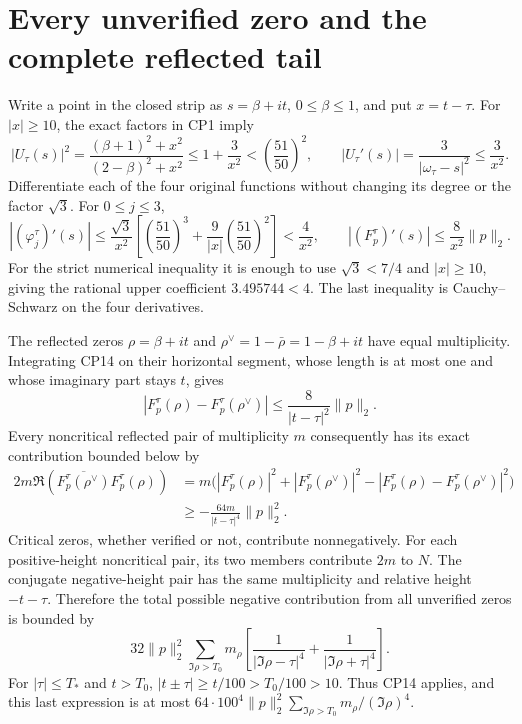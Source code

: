 \documentclass[11pt]{article}
\begin{document}
\section{Every unverified zero and the complete reflected tail}
Write a point in the closed strip as $s=\beta+it$,
$0\le\beta\le1$, and put $x=t-\tau$. For $|x|\ge10$,
the exact factors in CP1 imply
\[
|U_\tau(s)|^2
=\frac{(\beta+1)^2+x^2}{(2-\beta)^2+x^2}
\le1+\frac3{x^2}<\left(\frac{51}{50}\right)^2,\qquad
|U_\tau'(s)|=\frac3{|\omega_\tau-s|^2}\le\frac3{x^2}.
\]
Differentiate each of the four original functions without
changing its degree or the factor $\sqrt3$. For $0\le j\le3$,
\begin{equation}
|(\varphi_j^\tau)'(s)|
\le\frac{\sqrt3}{x^2}
\left[\left(\frac{51}{50}\right)^3+
 \frac9{|x|}\left(\frac{51}{50}\right)^2\right]
<\frac4{x^2},\qquad
|(F_p^\tau)'(s)|\le\frac8{x^2}\|p\|_2 .
\tag{CP14}
\end{equation}
For the strict numerical inequality it is enough to use
$\sqrt3<7/4$ and $|x|\ge10$, giving the rational upper
coefficient $3.495744<4$.
The last inequality is Cauchy--Schwarz on the four derivatives.

The reflected zeros $\rho=\beta+it$ and
$\rho^\vee=1-\bar\rho=1-\beta+it$ have equal multiplicity.
Integrating CP14 on their horizontal segment, whose length
is at most one and whose imaginary part stays $t$, gives
\[
|F_p^\tau(\rho)-F_p^\tau(\rho^\vee)|
\le\frac8{|t-\tau|^2}\|p\|_2.
\]
Every noncritical reflected pair of multiplicity $m$ consequently
has its exact contribution bounded below by
\begin{align}
2m\Re(\overline{F_p^\tau(\rho^\vee)}F_p^\tau(\rho))
&=m\bigl(|F_p^\tau(\rho)|^2+|F_p^\tau(\rho^\vee)|^2
 -|F_p^\tau(\rho)-F_p^\tau(\rho^\vee)|^2\bigr)\nonumber\\
&\ge-\frac{64m}{|t-\tau|^4}\|p\|_2^2.
\tag{CP15}
\end{align}
Critical zeros, whether verified or not, contribute nonnegatively.
For each positive-height noncritical pair, its two members
contribute $2m$ to $N$. The conjugate negative-height pair
has the same multiplicity and relative height $-t-\tau$.
Therefore the total possible negative contribution from all
unverified zeros is bounded by
\[
32\|p\|_2^2
\sum_{\Im\rho>T_0}m_\rho
\left[\frac1{|\Im\rho-\tau|^4}
      +\frac1{|\Im\rho+\tau|^4}\right].
\]
For $|\tau|\le T_*$ and $t>T_0$,
$|t\pm\tau|\ge t/100>T_0/100>10$. Thus CP14 applies,
and this last expression is at most
$64\cdot100^4\|p\|_2^2\sum_{\Im\rho>T_0}m_\rho/(\Im\rho)^4$.
\end{document}

